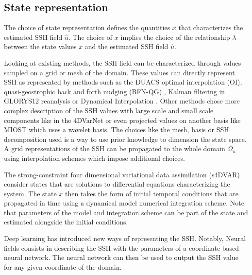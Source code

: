 \begin{bibunit}
 
  \subsection*{State representation}
The choice of state representation defines the quantities $x$ that characterizes the estimated SSH field $\hat{u}$. The choice of $x$ implies the choice of the relationship $\lambda$ between the state values $x$ and the estimated SSH field $\hat{u}$. 


  Looking at existing methods, the SSH field can be characterized through values sampled on a grid or mesh of the domain. These values can directly represent SSH as represented by methods such as the DUACS optimal interpolation \cite{taburetDUACSDT2018252019} (OI), quasi-geostrophic back and forth nudging (BFN-QG) \cite{guillouMappingAltimetryForthcoming2021}, Kalman filtering in GLORYS12 reanalysis \cite{lelloucheCopernicusGlobal122021} or Dynamical Interpolation \cite{ubelmannDynamicInterpolationSea2015,ballarottaDynamicMappingAlongTrack2020} .
  Other methods chose more complex description of the SSH values with large scale and small scale components like in the 4DVarNet\cite{beauchamp4DVarNetSSHEndtoendLearning2023} or even projected values on another basis like MIOST\cite{ubelmannReconstructingOceanSurface2021,ubelmannSimultaneousEstimationOcean2022} which uses a wavelet basis.
  The choices like the mesh, basis or SSH decomposition used is a way to use prior knowledge to dimension the state space. A grid representations of the SSH can be propagated to the whole domain $\Omega_u$ using interpolation schemes which impose additional choices.

  The strong-constraint four dimensional variational data assimilation (s4DVAR)\cite{carrassiDataAssimilationGeosciences2018} consider states that are solutions to differential equations characterizing the system. The state $x$ then takes the form of initial temporal conditions that are propagated in time using a dynamical model numerical integration scheme. Note that parameters of the model and integration scheme can be part of the state and estimated alongside the initial conditions. 

  Deep learning has introduced new ways of representing the SSH. Notably, Neural fields\cite{johnsonNeuralFieldsFast2022} consists in describing the SSH with the parameters of a coordinate-based neural network. The neural network can then be used to output the SSH value for any given coordinate of the domain.




\end{bibunit}

